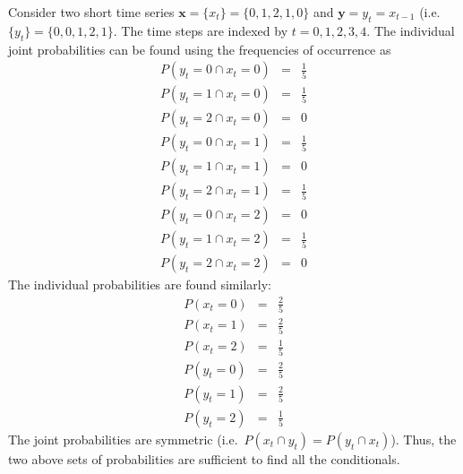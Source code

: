 \documentclass[a4paper,11pt]{article}
\begin{document}
Consider two short time series $\mathbf{x}=\{x_t\} = \{0,1,2,1,0\}$ and $\mathbf{y}=y_t=x_{t-1}$ (i.e.\ $\{y_t\} = \{0,0,1,2,1\}$.  The time steps are indexed by $t=0,1,2,3,4$.  The individual joint probabilities can be found using the frequencies of occurrence as
\begin{eqnarray}
P(y_t=0 \cap x_t = 0) &=& \frac{1}{5}\\
P(y_t=1 \cap x_t = 0) &=& \frac{1}{5}\\
P(y_t=2 \cap x_t = 0) &=& 0\\
P(y_t=0 \cap x_t = 1) &=& \frac{1}{5}\\
P(y_t=1 \cap x_t = 1) &=& 0\\
P(y_t=2 \cap x_t = 1) &=& \frac{1}{5}\\
P(y_t=0 \cap x_t = 2) &=& 0\\
P(y_t=1 \cap x_t = 2) &=& \frac{1}{5}\\
P(y_t=2 \cap x_t = 2) &=& 0
\end{eqnarray}
The individual probabilities are found similarly:
\begin{eqnarray}
P(x_t = 0) &=& \frac{2}{5}\\
P(x_t = 1) &=& \frac{2}{5}\\
P(x_t = 2) &=& \frac{1}{5}\\
P(y_t = 0) &=& \frac{2}{5}\\
P(y_t = 1) &=& \frac{2}{5}\\
P(y_t = 2) &=& \frac{1}{5}
\end{eqnarray}
The joint probabilities are symmetric (i.e.\ $P(x_t\cap y_t) = P(y_t\cap x_t)$).  Thus, the two above sets of probabilities are sufficient to find all the conditionals.  
\end{document}
